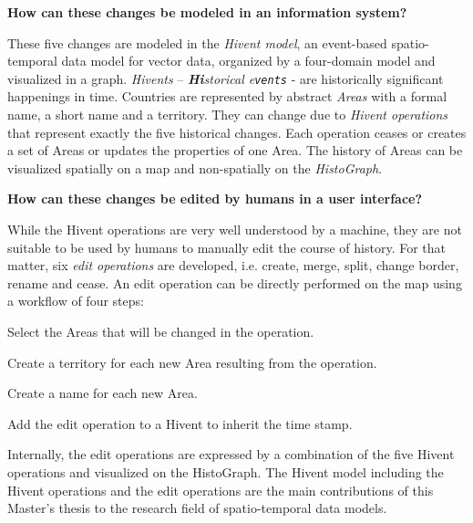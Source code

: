 \begin{description}[labelindent=0.1em]
  \item[\textbf{2a)}]
  \textbf{
    How can these changes be modeled in an information system?
  }
\end{description}

These five changes are modeled in the \emph{Hivent model}, an event-based spatio-temporal data model for vector data, organized by a four-domain model and visualized in a graph.
\emph{Hivents} -- \emph{\textbf{Hi}storical e\texttt{vents}} - are historically significant happenings in time.
Countries are represented by abstract \emph{Areas} with a formal name, a short name and a territory. They can change due to \emph{Hivent operations} that represent exactly the five historical changes. Each operation ceases or creates a set of Areas or updates the properties of one Area.
The history of Areas can be visualized spatially on a map and non-spatially on the \emph{HistoGraph}.

\begin{description}[labelindent=0.1em]
  \item[\textbf{2b)}]
  \textbf{
    How can these changes be edited by humans in a user interface?
  }
\end{description}

While the Hivent operations are very well understood by a machine, they are not suitable to be used by humans to manually edit the course of history. For that matter, six \emph{edit operations} are developed, i.e. create, merge, split, change border, rename and cease. An edit operation can be directly performed on the map using a workflow of four steps:

\begin{compactenum}
  \item Select the Areas that will be changed in the operation.
  \item Create a territory for each new Area resulting from the operation.
  \item Create a name for each new Area.
  \item Add the edit operation to a Hivent to inherit the time stamp.
\end{compactenum}

Internally, the edit operations are expressed by a combination of the five Hivent operations and visualized on the HistoGraph. The Hivent model including the Hivent operations and the edit operations are the main contributions of this Master's thesis to the research field of spatio-temporal data models.

